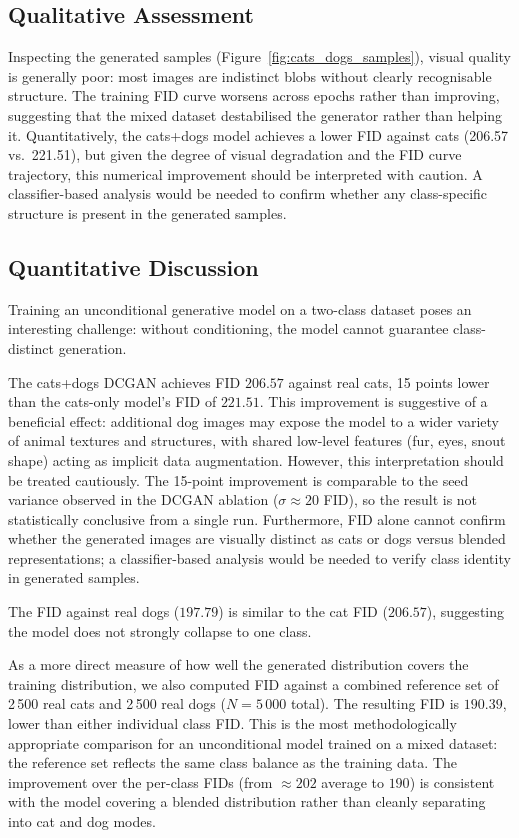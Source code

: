 \documentclass[12pt,a4paper]{article}
\begin{document}
\subsection{Qualitative Assessment}

Inspecting the generated samples (Figure~\ref{fig:cats_dogs_samples}), visual
quality is generally poor: most images are indistinct blobs without clearly
recognisable structure.  The training FID curve worsens across epochs rather
than improving, suggesting that the mixed dataset destabilised the generator
rather than helping it.  Quantitatively, the cats+dogs model achieves a lower
FID against cats (206.57 vs.\ 221.51), but given the degree of visual
degradation and the FID curve trajectory, this numerical improvement should be
interpreted with caution.  A classifier-based analysis would be needed to
confirm whether any class-specific structure is present in the generated samples.

\subsection{Quantitative Discussion}
Training an unconditional generative model on a two-class dataset poses an
interesting challenge: without conditioning, the model cannot guarantee
class-distinct generation.

The cats+dogs DCGAN achieves FID $206.57$ against real cats, 15 points lower
than the cats-only model's FID of $221.51$.  This improvement is suggestive of
a beneficial effect: additional dog images may expose the model to a wider
variety of animal textures and structures, with shared low-level features (fur,
eyes, snout shape) acting as implicit data augmentation.  However, this
interpretation should be treated cautiously.  The 15-point improvement is
comparable to the seed variance observed in the DCGAN ablation
($\sigma \approx 20$ FID), so the result is not statistically conclusive from a
single run.  Furthermore, FID alone cannot confirm whether the generated images
are visually distinct as cats or dogs versus blended representations; a
classifier-based analysis would be needed to verify class identity in generated
samples.

The FID against real dogs ($197.79$) is similar to the cat FID ($206.57$),
suggesting the model does not strongly collapse to one class.

As a more direct measure of how well the generated distribution covers the
training distribution, we also computed FID against a combined reference set of
2\,500 real cats and 2\,500 real dogs ($N=5\,000$ total).  The resulting FID is
$190.39$, lower than either individual class FID.  This is the most
methodologically appropriate comparison for an unconditional model trained on a
mixed dataset: the reference set reflects the same class balance as the training
data.  The improvement over the per-class FIDs (from $\approx202$ average to
$190$) is consistent with the model covering a blended distribution rather than
cleanly separating into cat and dog modes.
\end{document}
